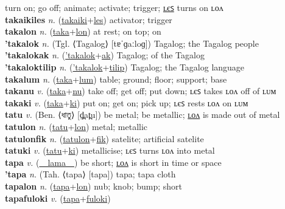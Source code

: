 turn on; go off; animate; activate; trigger; \hyperref[takaikiles]{ʟєꜱ} turns on ʟᴏᴧ \label{takaiki} \\
\textbf{takaikiles} \textit{n.} (\hyperref[takaiki]{takaiki}+\hyperref[les]{les})
activator; trigger \label{takaikiles} \\
\textbf{takalon} \textit{n.} (\hyperref[taka]{taka}+\hyperref[lon]{lon})
at rest; on top; on \label{takalon} \\
\textbf{'takalok} \textit{n.} (Tgl. ⟨Tagalog⟩ [tɐˈɡaːloɡ])
Tagalog; the Tagalog people \label{'takalok} \\
\textbf{'takalokak} \textit{n.} (\hyperref['takalok]{'takalok}+\hyperref[ak]{ak})
Tagalog; of the Tagalog \label{'takalokak} \\
\textbf{'takaloktilip} \textit{n.} (\hyperref['takalok]{'takalok}+\hyperref[tilip]{tilip})
Tagalog; the Tagalog language \label{'takaloktilip} \\
\textbf{takalum} \textit{n.} (\hyperref[taka]{taka}+\hyperref[lum]{lum})
table; ground; floor; support; base \label{takalum} \\
\textbf{takanu} \textit{v.} (\hyperref[taka]{taka}+\hyperref[nu]{nu})
take off; get off; put down; ʟєꜱ takes ʟᴏᴧ off of ʟᴜᴍ \label{takanu} \\
\textbf{takaki} \textit{v.} (\hyperref[taka]{taka}+\hyperref[ki]{ki})
put on; get on; pick up; ʟєꜱ rests ʟᴏᴧ on ʟᴜᴍ \label{takaki} \\
\textbf{tatu} \textit{v.} (Ben. ⟨ধাতু⟩ [d̪̤at̪u])
be metal; be metallic; \hyperref[tatulon]{ʟᴏᴧ} is made out of metal \label{tatu} \\
\textbf{tatulon} \textit{n.} (\hyperref[tatu]{tatu}+\hyperref[lon]{lon})
metal; metallic \label{tatulon} \\
\textbf{tatulonfik} \textit{n.} (\hyperref[tatulon]{tatulon}+\hyperref[fik]{fik})
satelite; artificial satelite \label{tatulonfik} \\
\textbf{tatuki} \textit{v.} (\hyperref[tatu]{tatu}+\hyperref[ki]{ki})
metallicise; ʟєꜱ turns ʟᴏᴧ into metal \label{tatuki} \\
\textbf{tapa} \textit{v.} (\hyperref[lama]{~~lama~~})
be short; \hyperref[tapalon]{ʟᴏᴧ} is short in time or space \label{tapa} \\
\textbf{'tapa} \textit{n.} (Tah. ⟨tapa⟩ [tapa])
tapa; tapa cloth \label{'tapa} \\
\textbf{tapalon} \textit{n.} (\hyperref[tapa]{tapa}+\hyperref[lon]{lon})
nub; knob; bump; short \label{tapalon} \\
\textbf{tapafuloki} \textit{v.} (\hyperref[tapa]{tapa}+\hyperref[fuloki]{fuloki})
